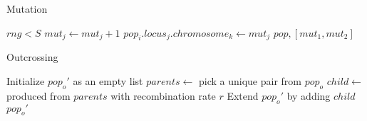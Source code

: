 \documentclass[12pt]{article}
\begin{document}
\begin{algorithm}
  \caption{Mutation}
  \label{algo:mutation}
  \begin{algorithmic}
     
     
    \If \(rng < S\)
    \State \(mut_{j} \gets mut_{j} + 1\)
    \State \(pop_{i}.locus_{j}.chromosome_{k} \gets mut_{j}\)
    \EndIf
    \EndFor
    \EndFor
    \EndFor
    \State \Return \(pop, [mut_{1}, mut_{2}]\)
    \EndFunction
  \end{algorithmic}
\end{algorithm}

\begin{algorithm}
  \caption{Outcrossing}
  \label{algo:outcrossing}
  \begin{algorithmic}
    \State Initialize \(pop_{o}'\) as an empty list
    \State \(parents \gets\) pick a unique pair from \(pop_{o}\)
    \State \(child \gets\) produced from \(parents\) with
    recombination rate \(r\)
    \State Extend \(pop_{o}'\) by adding \(child\)
    \EndFor
    \State \Return \(pop_{o}'\)
    \EndFunction
  \end{algorithmic}
\end{algorithm}
\end{document}
